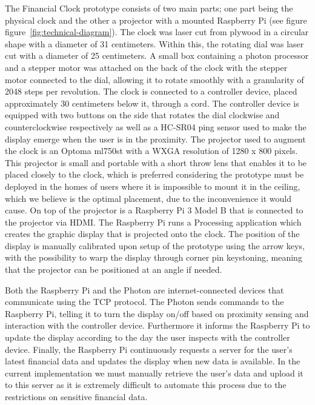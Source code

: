 The Financial Clock prototype consists of two main parts; one part being the physical clock and the other a projector with a mounted Raspberry Pi (see figure figure~\ref{fig:technical-diagram}). The clock was laser cut from plywood in a circular shape with a diameter of 31 centimeters. Within this, the rotating dial was laser cut with a diameter of 25 centimeters. A small box containing a photon processor and a stepper motor was attached on the back of the clock with the stepper motor connected to the dial, allowing it to rotate smoothly with a granularity of 2048 steps per revolution. The clock is connected to a controller device, placed approximately 30 centimeters below it, through a cord. The controller device is equipped with two buttons on the side that rotates the dial clockwise and counterclockwise respectively as well as a HC-SR04 ping sensor used to make the display emerge when the user is in the proximity. The projector used to augment the clock is an Optoma ml750st with a WXGA resolution of 1280 x 800 pixels. This projector is small and portable with a short throw lens that enables it to be placed closely to the clock, which is preferred considering the prototype must be deployed in the homes of users where it is impossible to mount it in the ceiling, which we believe is the optimal placement, due to the inconvenience it would cause. On top of the projector is a Raspberry Pi 3 Model B that is connected to the projector via HDMI. The Raspberry Pi runs a Processing application which creates the graphic display that is projected onto the clock. The position of the display is manually calibrated upon setup of the prototype using the arrow keys, with the possibility to warp the display through corner pin keystoning, meaning that the projector can be positioned at an angle if needed.

Both the Raspberry Pi and the Photon are internet-connected devices that communicate using the TCP protocol. The Photon sends commands to the Raspberry Pi, telling it to turn the display on/off based on proximity sensing and interaction with the controller device. Furthermore it informs the Raspberry Pi to update the display according to the day the user inspects with the controller device. Finally, the Raspberry Pi continuously requests a server for the user’s latest financial data and updates the display when new data is available. In the current implementation we must manually retrieve the user’s data and upload it to this server as it is extremely difficult to automate this process due to the restrictions on sensitive financial data.
